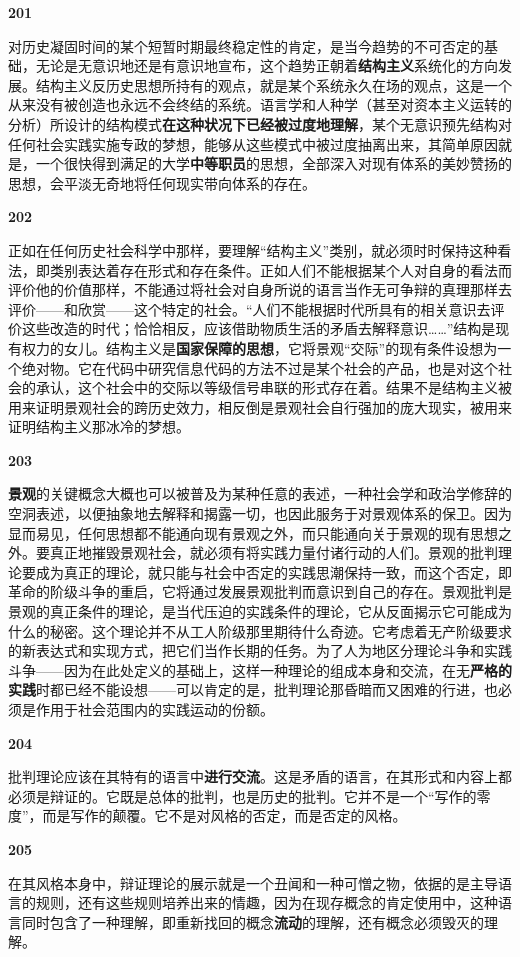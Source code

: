 \documentclass[fontset=fandol, a4paper, 12pt, openright]{ctexbook}
\makeatletter
\newcommand{\thesis}[1]{%
    \par\vspace{1.5em}%
    {\centering \textbf{\Large #1}\par}%
    \nobreak\vspace{0.5em}\nobreak
    \@afterindenttrue %
    \@afterheading    %
}
\makeatother
\begin{document}
\thesis{201}
对历史凝固时间的某个短暂时期最终稳定性的肯定，是当今趋势的不可否定的基础，无论是无意识地还是有意识地宣布，这个趋势正朝着\textbf{结构主义}系统化的方向发展。结构主义反历史思想所持有的观点，就是某个系统永久在场的观点，这是一个从来没有被创造也永远不会终结的系统。语言学和人种学（甚至对资本主义运转的分析）所设计的结构模式\textbf{在这种状况下已经被过度地理解}，某个无意识预先结构对任何社会实践实施专政的梦想，能够从这些模式中被过度抽离出来，其简单原因就是，一个很快得到满足的大学\textbf{中等职员}的思想，全部深入对现有体系的美妙赞扬的思想，会平淡无奇地将任何现实带向体系的存在。

\thesis{202}
正如在任何历史社会科学中那样，要理解“结构主义”类别，就必须时时保持这种看法，即类别表达着存在形式和存在条件。正如人们不能根据某个人对自身的看法而评价他的价值那样，不能通过将社会对自身所说的语言当作无可争辩的真理那样去评价——和欣赏——这个特定的社会。“人们不能根据时代所具有的相关意识去评价这些改造的时代；恰恰相反，应该借助物质生活的矛盾去解释意识……”结构是现有权力的女儿。结构主义是\textbf{国家保障的思想}，它将景观“交际”的现有条件设想为一个绝对物。它在代码中研究信息代码的方法不过是某个社会的产品，也是对这个社会的承认，这个社会中的交际以等级信号串联的形式存在着。结果不是结构主义被用来证明景观社会的跨历史效力，相反倒是景观社会自行强加的庞大现实，被用来证明结构主义那冰冷的梦想。

\thesis{203}
\textbf{景观}的关键概念大概也可以被普及为某种任意的表述，一种社会学和政治学修辞的空洞表述，以便抽象地去解释和揭露一切，也因此服务于对景观体系的保卫。因为显而易见，任何思想都不能通向现有景观之外，而只能通向关于景观的现有思想之外。要真正地摧毁景观社会，就必须有将实践力量付诸行动的人们。景观的批判理论要成为真正的理论，就只能与社会中否定的实践思潮保持一致，而这个否定，即革命的阶级斗争的重启，它将通过发展景观批判而意识到自己的存在。景观批判是景观的真正条件的理论，是当代压迫的实践条件的理论，它从反面揭示它可能成为什么的秘密。这个理论并不从工人阶级那里期待什么奇迹。它考虑着无产阶级要求的新表达式和实现方式，把它们当作长期的任务。为了人为地区分理论斗争和实践斗争——因为在此处定义的基础上，这样一种理论的组成本身和交流，在无\textbf{严格的实践}时都已经不能设想——可以肯定的是，批判理论那昏暗而又困难的行进，也必须是作用于社会范围内的实践运动的份额。

\thesis{204}
批判理论应该在其特有的语言中\textbf{进行交流}。这是矛盾的语言，在其形式和内容上都必须是辩证的。它既是总体的批判，也是历史的批判。它并不是一个“写作的零度”，而是写作的颠覆。它不是对风格的否定，而是否定的风格。

\thesis{205}
在其风格本身中，辩证理论的展示就是一个丑闻和一种可憎之物，依据的是主导语言的规则，还有这些规则培养出来的情趣，因为在现存概念的肯定使用中，这种语言同时包含了一种理解，即重新找回的概念\textbf{流动}的理解，还有概念必须毁灭的理解。
\end{document}
